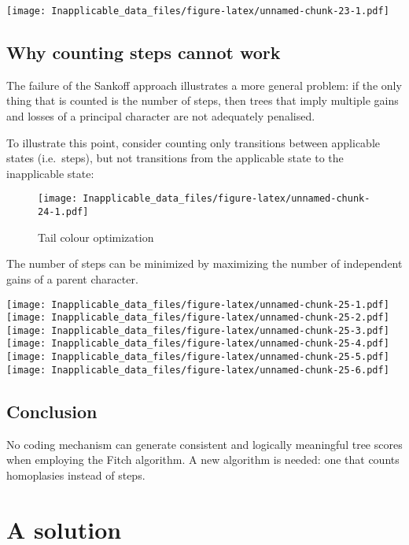 \documentclass[]{book}
\theoremstyle{definition}
\theoremstyle{definition}
\theoremstyle{definition}
\theoremstyle{remark}
\begin{document}
\texttt{[image: Inapplicable\_data\_files/figure-latex/unnamed-chunk-23-1.pdf]}

\hypertarget{why-counting-steps-cannot-work}{%
\section{Why counting steps cannot
work}\label{why-counting-steps-cannot-work}}

The failure of the Sankoff approach illustrates a more general problem:
if the only thing that is counted is the number of steps, then trees
that imply multiple gains and losses of a principal character are not
adequately penalised.

To illustrate this point, consider counting only transitions between
applicable states (i.e.~steps), but not transitions from the applicable
state to the inapplicable state:

\begin{figure}
\centering
\texttt{[image: Inapplicable\_data\_files/figure-latex/unnamed-chunk-24-1.pdf]}
\caption{\label{fig:unnamed-chunk-24}Tail colour optimization}
\end{figure}

The number of steps can be minimized by maximizing the number of
independent gains of a parent character.

\texttt{[image: Inapplicable\_data\_files/figure-latex/unnamed-chunk-25-1.pdf]}
\texttt{[image: Inapplicable\_data\_files/figure-latex/unnamed-chunk-25-2.pdf]}
\texttt{[image: Inapplicable\_data\_files/figure-latex/unnamed-chunk-25-3.pdf]}
\texttt{[image: Inapplicable\_data\_files/figure-latex/unnamed-chunk-25-4.pdf]}
\texttt{[image: Inapplicable\_data\_files/figure-latex/unnamed-chunk-25-5.pdf]}
\texttt{[image: Inapplicable\_data\_files/figure-latex/unnamed-chunk-25-6.pdf]}

\hypertarget{conclusion}{%
\section{Conclusion}\label{conclusion}}

No coding mechanism can generate consistent and logically meaningful
tree scores when employing the Fitch algorithm. A new algorithm is
needed: one that counts homoplasies instead of steps.

\hypertarget{solution}{%
\chapter{A solution}\label{solution}}
\end{document}
